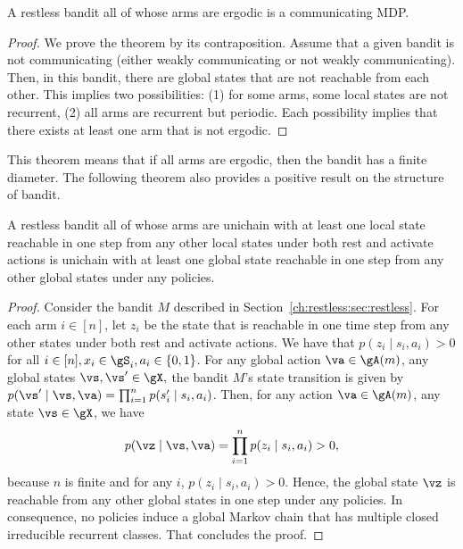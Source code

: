 \begin{thm}
    \label{thm:aperiodic_RB_comm} A restless bandit all of whose arms are ergodic is a communicating MDP.
\end{thm}
\begin{proof}
    We prove the theorem by its contraposition. Assume that a given bandit is not communicating (either weakly communicating or not weakly communicating).
    Then, in this bandit, there are global states that are not reachable from each other.
    This implies two possibilities: (1) for some arms, some local states are not recurrent, (2) all arms are recurrent but periodic.
    Each possibility implies that there exists at least one arm that is not ergodic.
\end{proof}
This theorem means that if all arms are ergodic, then the bandit has a finite diameter.
The following theorem also provides a positive result on the structure of bandit.

\begin{thm}
    \label{thm:unichain}
    A restless bandit all of whose arms are unichain with at least one local state reachable in one step from any other local states under both rest and activate actions is unichain with at least one global state reachable in one step from any other global states under any policies.
\end{thm}
\begin{proof}
    Consider the bandit $M$ described in Section~\ref{ch:restless:sec:restless}.
    For each arm $i\in[n]$, let $z_i$ be the state that is reachable in one time step from any other states under both rest and activate actions.
    We have that $p(z_i \mid s_i, a_i)>0$ for all $i\in[n], x_i\in\gS_i,a_i\in\{0,1\}$.
    For any global action $\va\in\gA(m)$, any global states $\vs,\vs'\in\gX,$ the bandit $M$'s state transition is given by ${p(\vs' \mid \vs, \va) =\prod_{i=1}^n p(s'_i \mid s_i, a_i)}$.
    Then, for any action $\va\in\gA(m)$, any state $\vs\in\gX$, we have
    \begin{align*}
        p(\vz \mid \vs, \va) =\prod_{i=1}^n p(z_i \mid s_i,a_i) > 0,
    \end{align*}
    because $n$ is finite and for any $i$, $p(z_i \mid s_i, a_i)>0$.
    Hence, the global state $\vz$ is reachable from any other global states in one step under any policies.
    In consequence, no policies induce a global Markov chain that has multiple closed irreducible recurrent classes.
    That concludes the proof.
\end{proof}

